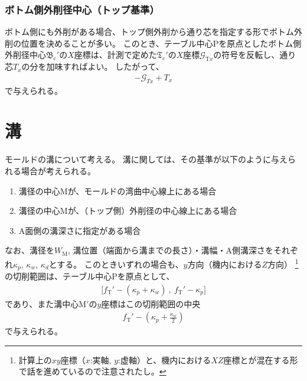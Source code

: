 \subsection{ボトム側外削径中心（トップ基準）}
ボトム側にも外削がある場合、トップ側外削から通り芯を指定する形でボトム外削の位置を決めることが多い。
このとき、テーブル中心Pを原点としたボトム側外削径中心$\mathfrak B_\mathrm c'$の$X$座標は、計測で定めた$\mathfrak T_\mathrm c'$の$X$座標$\mathcal G_{\mathrm Tx}$の符号を反転し、通り芯$T_x$の分を加味すればよい。
したがって、
\begin{align*}
  -\mathcal G_{Tx}+T_x
\end{align*}
で与えられる。





\chapter{溝}
モールドの溝について考える。
溝に関しては、その基準が以下のように与えられる場合が考えられる。
\begin{enumerate}
\item 溝径の中心Mが、モールドの湾曲中心線上にある場合
\item 溝径の中心Mが、（トップ側）外削径の中心線上にある場合
\item A面側の溝深さに指定がある場合
\end{enumerate}
なお、溝径を$W_\mathrm M$, 溝位置（端面から溝までの長さ）・溝幅・A側溝深さをそれぞれ$\kappa_p$, $\kappa_w$, $\kappa_d$とする。
このときいずれの場合も、$y$方向（機内における$Z$方向）
\footnote{計算上の$xy$座標（$x$:実軸, $y$:虚軸）と、機内における$XZ$座標とが混在する形で話を進めているので注意されたし。}\relax
の切削範囲は、テーブル中心Pを原点として、
\begin{align*}
  \big[f_\mathrm T'-(\kappa_p+\kappa_w)\ ,\ f_\mathrm T'-\kappa_p\big]
\end{align*}
であり、また溝中心M$'$の$y$座標はこの切削範囲の中央
\begin{align*}
  f_\mathrm T'-\left(\kappa_p+\frac{\kappa_w}2\right)
\end{align*}
で与えられる。



